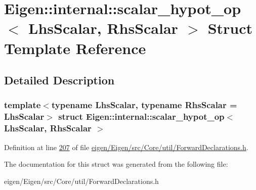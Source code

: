 \hypertarget{struct_eigen_1_1internal_1_1scalar__hypot__op}{}\section{Eigen\+:\+:internal\+:\+:scalar\+\_\+hypot\+\_\+op$<$ Lhs\+Scalar, Rhs\+Scalar $>$ Struct Template Reference}
\label{struct_eigen_1_1internal_1_1scalar__hypot__op}


\subsection{Detailed Description}
\subsubsection*{template$<$typename Lhs\+Scalar, typename Rhs\+Scalar = Lhs\+Scalar$>$\newline
struct Eigen\+::internal\+::scalar\+\_\+hypot\+\_\+op$<$ Lhs\+Scalar, Rhs\+Scalar $>$}



Definition at line \hyperlink{eigen_2_eigen_2src_2_core_2util_2_forward_declarations_8h_source_l00207}{207} of file \hyperlink{eigen_2_eigen_2src_2_core_2util_2_forward_declarations_8h_source}{eigen/\+Eigen/src/\+Core/util/\+Forward\+Declarations.\+h}.



The documentation for this struct was generated from the following file\+:\begin{DoxyCompactItemize}
\item 
eigen/\+Eigen/src/\+Core/util/\+Forward\+Declarations.\+h\end{DoxyCompactItemize}
